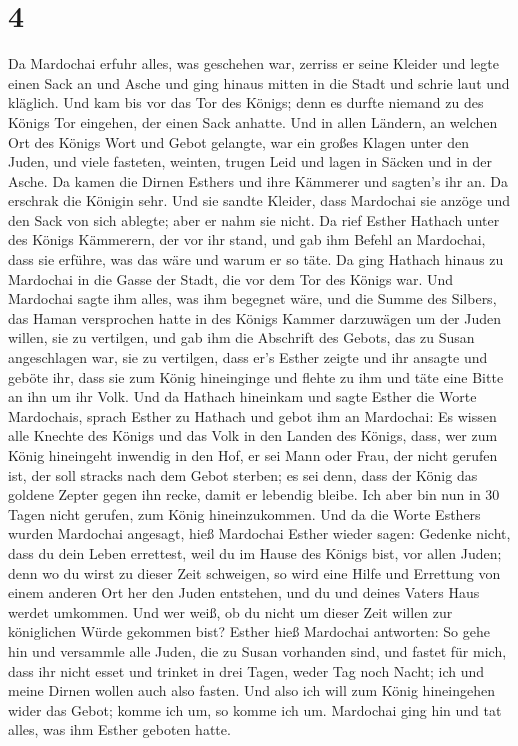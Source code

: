 \hypertarget{section-3}{%
\section{4}\label{section-3}}

 Da Mardochai erfuhr alles, was geschehen war, zerriss er
seine Kleider und legte einen Sack an und Asche und ging hinaus mitten
in die Stadt und schrie laut und kläglich.  Und kam bis
vor das Tor des Königs; denn es durfte niemand zu des Königs Tor
eingehen, der einen Sack anhatte.  Und in allen Ländern,
an welchen Ort des Königs Wort und Gebot gelangte, war ein großes Klagen
unter den Juden, und viele fasteten, weinten, trugen Leid und lagen in
Säcken und in der Asche.  Da kamen die Dirnen Esthers und
ihre Kämmerer und sagten's ihr an. Da erschrak die Königin sehr. Und sie
sandte Kleider, dass Mardochai sie anzöge und den Sack von sich ablegte;
aber er nahm sie nicht.  Da rief Esther Hathach unter des
Königs Kämmerern, der vor ihr stand, und gab ihm Befehl an Mardochai,
dass sie erführe, was das wäre und warum er so täte.  Da
ging Hathach hinaus zu Mardochai in die Gasse der Stadt, die vor dem Tor
des Königs war.  Und Mardochai sagte ihm alles, was ihm
begegnet wäre, und die Summe des Silbers, das Haman versprochen hatte in
des Königs Kammer darzuwägen um der Juden willen, sie zu vertilgen,
 und gab ihm die Abschrift des Gebots, das zu Susan
angeschlagen war, sie zu vertilgen, dass er's Esther zeigte und ihr
ansagte und geböte ihr, dass sie zum König hineinginge und flehte zu ihm
und täte eine Bitte an ihn um ihr Volk.  Und da Hathach
hineinkam und sagte Esther die Worte Mardochais,  sprach
Esther zu Hathach und gebot ihm an Mardochai:  Es wissen
alle Knechte des Königs und das Volk in den Landen des Königs, dass, wer
zum König hineingeht inwendig in den Hof, er sei Mann oder Frau, der
nicht gerufen ist, der soll stracks nach dem Gebot sterben; es sei denn,
dass der König das goldene Zepter gegen ihn recke, damit er lebendig
bleibe. Ich aber bin nun in 30 Tagen nicht gerufen, zum König
hineinzukommen.  Und da die Worte Esthers wurden
Mardochai angesagt,  hieß Mardochai Esther wieder sagen:
Gedenke nicht, dass du dein Leben errettest, weil du im Hause des Königs
bist, vor allen Juden;  denn wo du wirst zu dieser Zeit
schweigen, so wird eine Hilfe und Errettung von einem anderen Ort her
den Juden entstehen, und du und deines Vaters Haus werdet umkommen. Und
wer weiß, ob du nicht um dieser Zeit willen zur königlichen Würde
gekommen bist?  Esther hieß Mardochai antworten:
 So gehe hin und versammle alle Juden, die zu Susan
vorhanden sind, und fastet für mich, dass ihr nicht esset und trinket in
drei Tagen, weder Tag noch Nacht; ich und meine Dirnen wollen auch also
fasten. Und also ich will zum König hineingehen wider das Gebot; komme
ich um, so komme ich um.  Mardochai ging hin und tat
alles, was ihm Esther geboten hatte.

